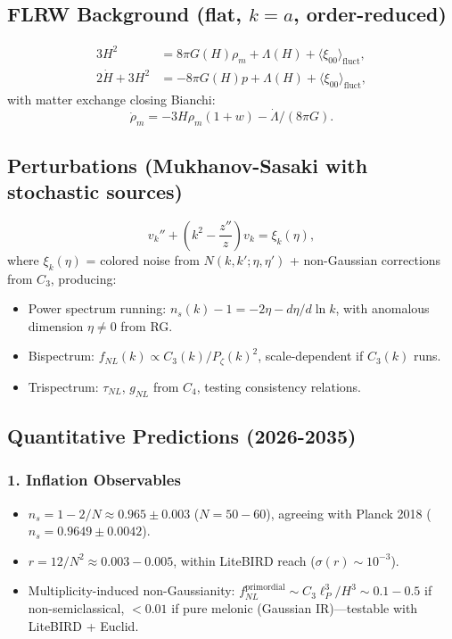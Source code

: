 \documentclass[12pt,a4paper]{article}
\begin{document}
\subsection{FLRW Background (flat, \(k = a\), order-reduced)}

\begin{align}
3H^2 &= 8\pi G(H)\rho_m + \Lambda(H) + \langle \xi_{00} \rangle_{\text{fluct}}, \\
2\dot{H} + 3H^2 &= -8\pi G(H)p + \Lambda(H) + \langle \xi_{00} \rangle_{\text{fluct}},
\end{align}
with matter exchange closing Bianchi:
\begin{equation}
\dot{\rho}_m = -3H\rho_m(1 + w) - \dot{\Lambda}/(8\pi G).
\end{equation}

\subsection{Perturbations (Mukhanov-Sasaki with stochastic sources)}

\begin{equation}
v_k'' + \left(k^2 - \frac{z''}{z}\right) v_k = \xi_k(\eta),
\end{equation}
where \(\xi_k(\eta)\) = colored noise from \(N(k, k'; \eta, \eta')\) + non-Gaussian corrections from \(C_3\), producing:
\begin{itemize}
\item Power spectrum running: \(n_s(k) - 1 = -2\eta - d\eta/d\ln k\), with anomalous dimension \(\eta \neq 0\) from RG.
\item Bispectrum: \(f_{NL}(k) \propto C_3(k)/P_\zeta(k)^2\), scale-dependent if \(C_3(k)\) runs.
\item Trispectrum: \(\tau_{NL}\), \(g_{NL}\) from \(C_4\), testing consistency relations.
\end{itemize}

\subsection{Quantitative Predictions (2026-2035)}

\subsubsection{1. Inflation Observables}

\begin{itemize}
\item \(n_s = 1 - 2/N \approx 0.965 \pm 0.003\) (\(N = 50-60\)), agreeing with Planck 2018 (\(n_s = 0.9649 \pm 0.0042\)).
\item \(r = 12/N^2 \approx 0.003-0.005\), within LiteBIRD reach (\(\sigma(r) \sim 10^{-3}\)).
\item Multiplicity-induced non-Gaussianity: \(f_{NL}^{\text{primordial}} \sim C_3\ell_P^3/H^3 \sim 0.1-0.5\) if non-semiclassical, \(< 0.01\) if pure melonic (Gaussian IR)—testable with LiteBIRD + Euclid.
\end{itemize}
\end{document}
